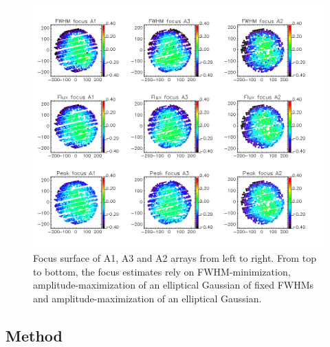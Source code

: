 \begin{figure}
\begin{center}
  \includegraphics[trim={0, 1cm, 0, 1cm}, clip, angle=0, scale=0.5]{Figures/fov_focus_mv_5.png}
\caption[Focus surfaces]{Focus surface of A1, A3 and A2 arrays from left to
  right. From top to bottom, the focus estimates rely on
  FWHM-minimization, amplitude-maximization of an elliptical
  Gaussian of fixed FWHMs and amplitude-maximization of an elliptical
  Gaussian.  }
\label{fig:focus-surfaces}
\end{center}
\end{figure}

\subsection{Method}

